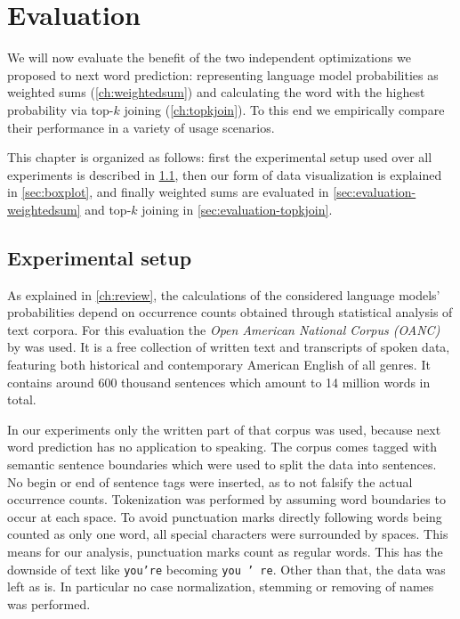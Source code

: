 \chapter{Evaluation}
\label{ch:evaluation}

We will now evaluate the benefit of the two independent optimizations we
proposed to next word prediction: representing language model probabilities as
weighted sums (\cref{ch:weightedsum}) and calculating the word with the highest
probability via top-$k$ joining (\cref{ch:topkjoin}).
To this end we empirically compare their performance in a variety of usage
scenarios.

This chapter is organized as follows:
first the experimental setup used over all experiments is described in
\cref{sec:experimental-setup}, then our form of data visualization is explained
in \cref{sec:boxplot}, and finally weighted sums are evaluated in
\cref{sec:evaluation-weightedsum} and top-$k$ joining in
\cref{sec:evaluation-topkjoin}.


\section{Experimental setup}
\label{sec:experimental-setup}

As explained in \cref{ch:review}, the calculations of the considered language
models' probabilities depend on occurrence counts obtained through statistical
analysis of text corpora.
For this evaluation the \emph{Open American National Corpus (OANC)} by
\textcite{OANC} was used.
It is a free collection of written text and transcripts of spoken data,
featuring both historical and contemporary American English of all genres.
It contains around 600 thousand sentences which amount to 14 million words in
total.

In our experiments only the written part of that corpus was used, because next
word prediction has no application to speaking.
The corpus comes tagged with semantic sentence boundaries which were used to
split the data into sentences.
No begin or end of sentence tags were inserted, as to not falsify the actual
occurrence counts.
Tokenization was performed by assuming word boundaries to occur at each space.
To avoid punctuation marks directly following words being counted as only one
word, all special characters were surrounded by spaces.
This means for our analysis, punctuation marks count as regular words.
This has the downside of text like \texttt{you're} becoming \texttt{you ' re}.
Other than that, the data was left as is.
In particular no case normalization, stemming or removing of names was
performed.


